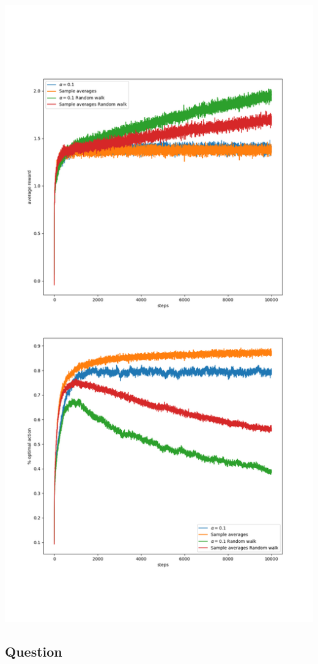 \documentclass{article}
\begin{document}
    \includegraphics[scale=0.5]{figure_e_2_5}

    \subsection{Question}
\end{document}
